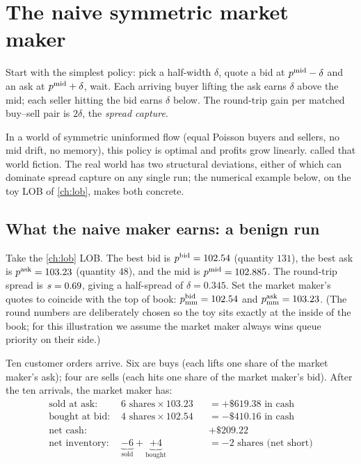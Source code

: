 \section{The naive symmetric market maker}
\label{sec:ch8_naive}

Start with the simplest policy: pick a half-width $\delta$, quote a
bid at $p^{\mathrm{mid}} - \delta$ and an ask at $p^{\mathrm{mid}} + \delta$, wait. Each
arriving buyer lifting the ask earns $\delta$ above the mid; each
seller hitting the bid earns $\delta$ below. The round-trip gain per
matched buy--sell pair is $2\delta$, the \emph{spread capture}.

In a world of symmetric uninformed flow (equal Poisson buyers and
sellers, no mid drift, no memory), this policy is optimal and
profits grow linearly.  called that world
fiction. The real world has two structural deviations, either of
which can dominate spread capture on any single run; the numerical
example below, on the toy LOB of \cref{ch:lob}, makes both concrete.

\subsection{What the naive maker earns: a benign run}
\label{subsec:naive_benign}

Take the \cref{ch:lob} LOB. The best bid is $p^{\mathrm{bid}} = 102.54$
(quantity $131$), the best ask is $p^{\mathrm{ask}} = 103.23$ (quantity $48$),
and the mid is $p^{\mathrm{mid}} = 102.885$. The round-trip spread is
$s = 0.69$, giving a half-spread of $\delta = 0.345$. Set
the market maker's quotes to coincide with the top of book:
$p^{\mathrm{bid}}_{\mathrm{mm}} = 102.54$ and $p^{\mathrm{ask}}_{\mathrm{mm}} = 103.23$.
(The round numbers are deliberately chosen so the toy sits exactly
at the inside of the book; for this illustration we assume the
market maker always wins queue priority on their side.)

Ten customer orders arrive. Six are buys (each lifts one share of
the market maker's ask); four are sells (each hits one share of the
market maker's bid). After the ten arrivals, the market maker has:
\begin{align*}
  \text{sold at ask: } & 6 \text{ shares} \times 103.23
      &&= +\$619.38 \text{ in cash} \\
  \text{bought at bid: } & 4 \text{ shares} \times 102.54
      &&= -\$410.16 \text{ in cash} \\
  \text{net cash: } & && +\$209.22 \\
  \text{net inventory: } & \underbrace{-6}_{\text{sold}} +
      \underbrace{+4}_{\text{bought}}
      &&= -2 \text{ shares (net short)}
\end{align*}

